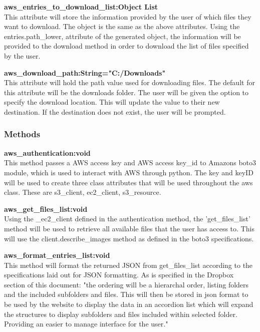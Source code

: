 \textbf{aws\_entries\_to\_download\_list:Object List} \\
    This attribute will store the information provided by the user of which files they want to download. The object is the same as the above 
    attributes. Using the entries.path\_lower, attribute of the generated object, the information will be provided to the download method in 
    order to download the list of files specified by the user.

\textbf{aws\_download\_path:String="C:/Downloads"} \\
    This attribute will hold the path value used for downloading files. The default for this attribute will be the downloads folder. The user 
    will be given the option to specify the download location. This will update the value to their new destination. If the destination does 
    not exist, the user will be prompted.

\subsubsection{Methods}
\textbf{aws\_authentication:void} \\
    This method passes a AWS access key and AWS access key\_id to Amazons boto3 module, which is used to interact with AWS through python. The key 
    and keyID will be used to create three class attributes that will be used throughout the aws class. These are s3\_client, ec2\_client, s3\_resource.
    
\textbf{aws\_get\_files\_list:void} \\
    Using the \_ec2\_client defined in the authentication method, the 'get\_files\_list' method will be used to retrieve all available files that the user 
    has access to. This will use the client.describe\_images method as defined in the boto3 specifications.

\textbf{aws\_format\_entries\_list:void} \\
    This method will format the returned JSON from get\_files\_list according to the specifications laid out for JSON formatting. As is specified in the
    Dropbox section of this document: "the ordering will be a hierarchal order, listing folders and the included subfolders and files. This will then be stored in json format to be used by the website to display the data in an
    accordion list which will expand the structures to display subfolders and files included within selected folder. Providing an easier to manage
    interface for the user."

